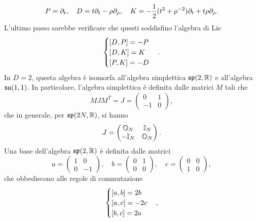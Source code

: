\begin{equation}
    P = \partial_t,\quad D = t\partial_t - \rho\partial_\rho,\quad K = -\frac{1}{2}(t^2 + \rho^{-2})\partial_t + t\rho\partial_\rho.
\end{equation} 
L'ultimo passo sarebbe verificare che questi soddisfino l'algebra di Lie 
\begin{equation}
    \begin{cases}
        \comm{D}{P} = -P \\
        \comm{D}{K} = K \\
        \comm{P}{K} = -D
    \end{cases}.
\end{equation}
In $D = 2$, questa algebra è isomorfa all'algebra simplettica $\mathfrak{sp}(2,\mathbb{R})$ e all'algebra $\mathfrak{su}(1,1)$. In particolare, l'algebra simplettica è definita dalle matrici $M$ tali che 
\begin{equation}
    MJM^T = J = 
    \begin{pmatrix}
        0 & 1 \\
        -1 & 0
    \end{pmatrix},
\end{equation}
che in generale, per $\mathfrak{sp}(2N,\mathbb{R})$, si hanno 
\begin{equation}
    J = 
    \begin{pmatrix}
        \mathbb{O}_N & \mathbb{I}_N \\
        -\mathbb{I}_N & \mathbb{O}_N
    \end{pmatrix}.
\end{equation}
Una base dell'algebra $\mathfrak{sp}(2,\mathbb{R})$ è definita dalle matrici 
\begin{equation}
    a = 
    \begin{pmatrix}
        1 & 0 \\
        0 & -1    
    \end{pmatrix},\quad b = 
    \begin{pmatrix}
        0 & 1 \\
        0 & 0
    \end{pmatrix},\quad c = 
    \begin{pmatrix}
        0 & 0 \\
        1 & 0
    \end{pmatrix},
\end{equation}
che obbediscono alle regole di commutazione 
\begin{equation}
    \begin{cases}
        \comm{a}{b} = 2b \\
        \comm{a}{c} = -2c \\
        \comm{b}{c} = 2a
    \end{cases},
\end{equation}
